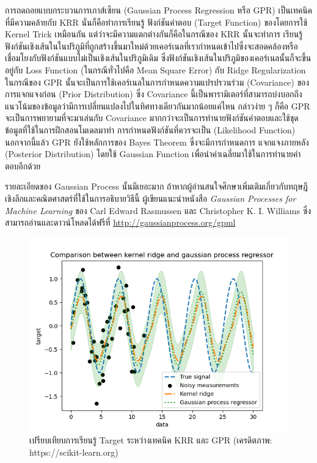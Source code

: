 การถดถอยแบบกระบวนการเกาส์เซียน (Gaussian Process Regression หรือ GPR) เป็นเทคนิคที่มีความคล้ายกับ KRR นั่นก็คือทำการเรียนรู้
ฟังก์ชันคำตอบ (Target Function) ของโดยการใช้ Kernel Trick เหมือนกัน แต่ว่าจะมีความแตกต่างกันก็คือในกรณีของ KRR นั้นจะทำการ%
เรียนรู้ฟังก์ชันเชิงเส้นในในปริภูมิที่ถูกสร้างขึ้นมาใหม่ด้วยเคอร์เนลที่เรากำหนดเข้าไปซึ่งจะสอดคล้องหรือเชื่อมโยงกับฟังก์ชันแบบไม่เป็นเชิงเส้นในปริภูมิเดิม 
ซึ่งฟังก์ชันเชิงเส้นในปริภูมิของเคอร์เนลนั้นก็จะขึ้นอยู่กับ Loss Function (ในกรณีทั่วไปคือ Mean Square Error) กับ Ridge Regularization 
ในกรณีของ GPR นั้นจะเป็นการใช้เคอร์เนลในการกำหนดความแปรปรวนร่วม (Covariance) ของการแจกแจงก่อน (Prior Distribution) 
ซึ่ง Covariance นี้เป็นพารามิเตอร์ที่สามารถบ่งบอกถึงแนวโน้มของข้อมูลว่ามีการเปลี่ยนแปลงไปในทิศทางเดียวกันมากน้อยแค่ไหน กล่าวง่าย ๆ 
ก็คือ GPR จะเป็นการพยายามที่จะมาเล่นกับ Covariance มากกว่าจะเป็นการทำนายฟังก์ชันคำตอบและใช้ชุดข้อมูลที่ใช้ในการฝึกสอนโมเดลมาทำ%
การกำหนดฟังก์ชันที่ควรจะเป็น (Likelihood Function) นอกจากนี้แล้ว GPR ยังใช้หลักการของ Bayes Theorem ซึ่งจะมีการกำหนดการ%
แจกแจงภายหลัง (Posterior Distribution) โดยใช้ Gaussian Function เพื่อนำค่าเฉลี่ยมาใช้ในการทำนายคำตอบอีกด้วย

รายละเอียดของ Gaussian Process นั้นมีเยอะมาก ถ้าหากผู้อ่านสนใจศึกษาเพิ่มเติมเกี่ยวกับทฤษฎีเชิงลึกและคณิตศาสตร์ที่ใช้ในการอธิบายวิธีนี้%
ผู้เขียนแนะนำหนังสือ \textit{Gaussian Processes for Machine Learning} ของ Carl Edward Rasmussen และ 
Christopher K. I. Williams ซึ่งสามารถอ่านและดาวน์โหลดได้ฟรีที่ \url{http://gaussianprocess.org/gpml}

\begin{figure}[htbp]
    \centering
    \includegraphics[width=0.8\linewidth]{fig/plot_gpr_kernel.png}
    \caption{เปรียบเทียบการเรียนรู้ Target ระหว่างเทคนิค KRR และ GPR (เครดิตภาพ: https://scikit-learn.org)}
    \label{fig:krr_gpr}
\end{figure}
